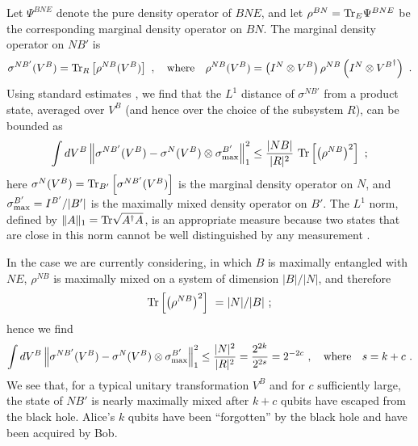 \documentclass[12pt]{article}
\begin{document}
Let $\Psi^{BNE}$ denote the pure density operator of $BNE$,  and let $\rho^{BN}={\rm Tr}_E\Psi^{BNE}$ be the corresponding marginal density operator on $BN$. The marginal density operator on $NB'$ is
\begin{eqnarray}
\sigma^{NB'}(V^B)= {\rm Tr}_R \left[\rho^{NB}(V^B)\right]~, \quad {\rm where}\quad 
\rho^{NB}(V^B)=\left(I^N\otimes V^B\right)\rho^{NB}\left(I^N\otimes {V^B}^\dagger \right)~.
\end{eqnarray}
Using standard estimates \cite{abeyesinghe,yard}, we find that the $L^1$ distance of $\sigma^{NB'}$ from a product state, averaged over $V^B$ (and hence over the choice of the subsystem $R$), can be bounded as
\begin{eqnarray}
\int dV^B\left\| \sigma^{NB'}(V^B)-\sigma^{N}(V^B)\otimes \sigma^{B'}_{\rm max}\right\|_1^2 \le \frac{|NB|}{|R|^2}~{\rm Tr}\left[\left(\rho^{NB}\right)^2\right]~;
\end{eqnarray}
here $\sigma^{N}(V^B)={\rm Tr}_{B'}\left[\sigma^{NB'}(V^B)\right]$
is the marginal density operator on $N$, and $\sigma^{B'}_{\rm max}= I^{B'}/|B'|$ is the maximally mixed density operator on $B'$. The $L^1$ norm, defined by $\|A\|_1= {\rm Tr} \sqrt{A^\dagger A}$, is an appropriate measure because two states that are close in this norm cannot be well distinguished by any measurement \cite{fuchs}. 

In the case we are currently considering, in which $B$ is maximally entangled with $NE$, $\rho^{NB}$ is maximally mixed on a system of dimension $|B|/|N|$, and therefore 
\begin{equation}
{\rm Tr}\left[\left(\rho^{NB}\right)^2\right]~= |N|/|B|~;
\end{equation}
hence we find
\begin{eqnarray}
\label{quantum-out}
\int dV^B\left\| \sigma^{NB'}(V^B)-\sigma^{N}(V^B)\otimes \sigma^{B'}_{\rm max}\right\|_1^2 \le \frac{|N|^2}{|R|^2}= \frac{2^{2k}}{2^{2s}}= 2^{-2c}~,\quad {\rm where}\quad s=k+c~.
\end{eqnarray}
We see that, for a typical unitary transformation $V^B$ and for $c$ sufficiently large, the state of $NB'$ is nearly maximally mixed after $k+c$ qubits have escaped from the black hole. Alice's $k$ qubits have been ``forgotten'' by the black hole and have been acquired by Bob.  
\end{document}
